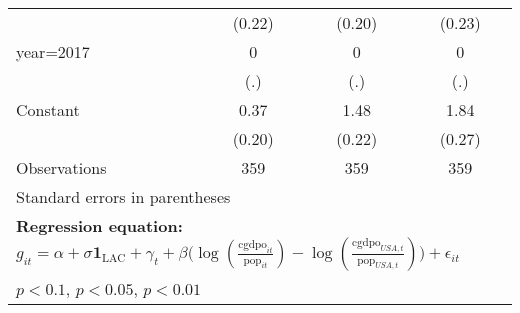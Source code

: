 \begin{table}[htbp]
\begin{tabular}{l*{3}{c}}
                &   (0.22)         &   (0.20)         &   (0.23)         \\
\addlinespace
year=2017       &        0         &        0         &        0         \\
                &      (.)         &      (.)         &      (.)         \\
\addlinespace
Constant        &     0.37\sym{*}  &     1.48\sym{***}&     1.84\sym{***}\\
                &   (0.20)         &   (0.22)         &   (0.27)         \\
\midrule
Observations    &      359         &      359         &      359         \\
\bottomrule
\multicolumn{4}{l}{\footnotesize Standard errors in parentheses}\\
\multicolumn{4}{l}{\footnotesize \textbf{Regression equation:} \(g_{it} = \alpha + \sigma \mathbf{1}_{\textrm{LAC}} + \gamma_t + \beta \big(\log (\frac{\textrm{cgdpo}_{it}}{\textrm{pop}_{it}} ) - \log (\frac{\textrm{cgdpo}_{USA,t}}{\textrm{pop}_{USA,t}}  ) \big) + \epsilon_{it}\)}\\
\multicolumn{4}{l}{\footnotesize \sym{*} \(p<0.1\), \sym{**} \(p<0.05\), \sym{***} \(p<0.01\)}\\
\end{tabular}
\end{table}

